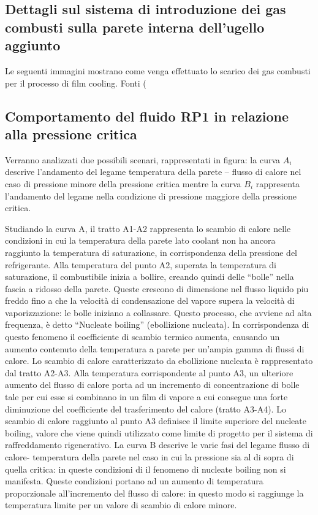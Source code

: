 \subsection{Dettagli sul sistema di introduzione dei gas combusti sulla parete interna dell'ugello aggiunto}
Le seguenti immagini mostrano come venga effettuato lo scarico dei gas combusti per il processo di film cooling. Fonti (\cite{site_exhaust} \cite{f-1_manual}
 



\subsection{Comportamento del fluido RP1 in relazione alla pressione critica}

 
Verranno analizzati due possibili scenari, rappresentati in figura: la curva $A_i$ descrive l'andamento del legame temperatura della parete – flusso di calore nel caso di pressione minore della pressione critica mentre la curva $B_i$ rappresenta l'andamento del legame nella condizione di pressione maggiore della pressione critica.

Studiando la curva A, il tratto A1-A2 rappresenta lo scambio di calore nelle condizioni in cui la temperatura della parete lato coolant non ha ancora raggiunto la temperatura di saturazione, in corrispondenza della pressione del refrigerante. Alla temperatura del punto A2, superata la temperatura di saturazione, il combustibile inizia a bollire, creando quindi delle “bolle” nella fascia a ridosso della parete. Queste crescono di dimensione nel flusso liquido piu freddo fino a che la velocità di condensazione del vapore supera la velocità di vaporizzazione: le bolle iniziano a collassare. Questo processo, che avviene ad alta frequenza, è detto “Nucleate boiling” (ebollizione nucleata). In corrispondenza di questo fenomeno il coefficiente di scambio termico aumenta, causando un aumento contenuto della temperatura a parete per un'ampia gamma di flussi di calore. Lo scambio di calore caratterizzato da ebollizione nucleata è rappresentato dal tratto A2-A3. Alla temperatura corrispondente al punto A3, un ulteriore aumento del flusso di calore porta ad un incremento di concentrazione di bolle tale per cui esse si combinano in un film di vapore a cui consegue una forte diminuzione del coefficiente del trasferimento del calore (tratto A3-A4). Lo scambio di calore raggiunto al punto A3 definisce il limite superiore del nucleate boiling, valore che viene quindi utilizzato come limite di progetto per il sistema di raffreddamento rigenerativo.
La curva B descrive le varie fasi del legame flusso di calore- temperatura della parete nel caso in cui la pressione sia al di sopra di quella critica: in queste condizioni di il fenomeno di nucleate boiling non si manifesta. Queste condizioni portano ad un aumento di temperatura proporzionale all'incremento del flusso di calore: in questo modo si raggiunge la temperatura limite per un valore di scambio di calore minore.

 